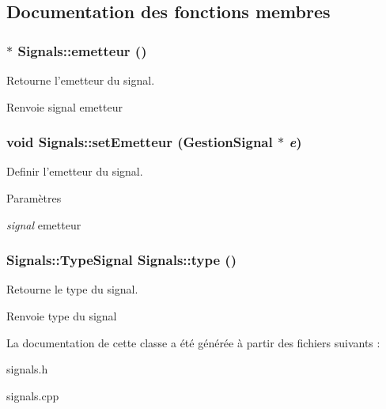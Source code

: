 \subsection{Documentation des fonctions membres}
\hypertarget{classSignals_abd873414eef1e8deb5dc8bcae33aa8fe}{
\subsubsection[{emetteur}]{ $\ast$ Signals::emetteur ()}}
\label{classSignals_abd873414eef1e8deb5dc8bcae33aa8fe}


Retourne l'emetteur du signal. 

\begin{DoxyReturn}{Renvoie}
signal emetteur 
\end{DoxyReturn}
\hypertarget{classSignals_a8a58cb7d36939d77e0319e47e787f262}{
\subsubsection[{setEmetteur}]{\setlength{\rightskip}{0pt plus 5cm}void Signals::setEmetteur ({\bf GestionSignal} $\ast$ {\em e})}}
\label{classSignals_a8a58cb7d36939d77e0319e47e787f262}


Definir l'emetteur du signal. 


\begin{DoxyParams}{Paramètres}
\item[{\em signal}]emetteur \end{DoxyParams}
\hypertarget{classSignals_af14716654fb552b8940935694edc1b69}{
\subsubsection[{type}]{\setlength{\rightskip}{0pt plus 5cm}Signals::TypeSignal Signals::type ()}}
\label{classSignals_af14716654fb552b8940935694edc1b69}


Retourne le type du signal. 

\begin{DoxyReturn}{Renvoie}
type du signal 
\end{DoxyReturn}


La documentation de cette classe a été générée à partir des fichiers suivants :\begin{DoxyCompactItemize}
\item 
signals.h\item 
signals.cpp\end{DoxyCompactItemize}

